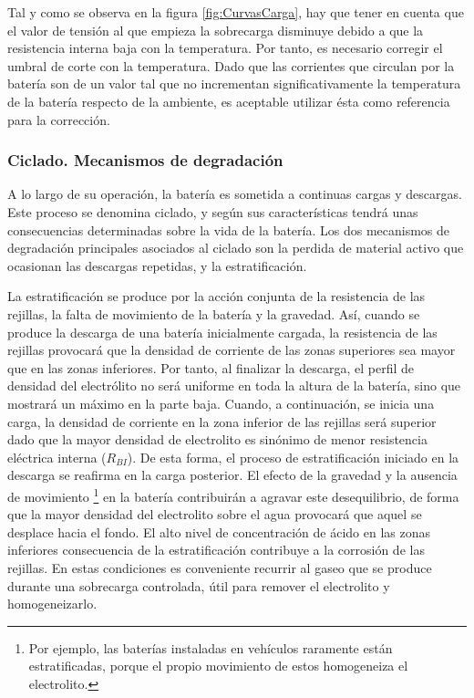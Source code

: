 Tal y como se observa en la figura \ref{fig:CurvasCarga}, hay que
tener en cuenta que el valor de tensión al que empieza la sobrecarga
disminuye debido a que la resistencia interna baja con la temperatura.
Por tanto, es necesario corregir el umbral de corte con la temperatura.
Dado que las corrientes que circulan por la batería son de un valor
tal que no incrementan significativamente la temperatura de la batería
respecto de la ambiente, es aceptable utilizar ésta como referencia
para la corrección.


\subsubsection{Ciclado. Mecanismos de degradación}

A lo largo de su operación, la batería es sometida a continuas cargas
y descargas. Este proceso se denomina ciclado, y según sus características
tendrá unas consecuencias determinadas sobre la vida de la batería.
Los dos mecanismos de degradación principales asociados al ciclado
son la perdida de material activo que ocasionan las descargas repetidas,
y la estratificación. 

La estratificación se produce por la acción conjunta de la resistencia
de las rejillas, la falta de movimiento de la batería y la gravedad.
Así, cuando se produce la descarga de una batería inicialmente
cargada, la resistencia de las rejillas provocará que la densidad de
corriente de las zonas superiores sea mayor que en las zonas
inferiores.  Por tanto, al finalizar la descarga, el perfil de
densidad del electrólito no será uniforme en toda la altura de la
batería, sino que mostrará un máximo en la parte baja. Cuando, a
continuación, se inicia una carga, la densidad de corriente en la zona
inferior de las rejillas será superior dado que la mayor densidad de
electrolito es sinónimo de menor resistencia eléctrica interna
($R_{BI}$). De esta forma, el proceso de estratificación iniciado en
la descarga se reafirma en la carga posterior. El efecto de la
gravedad y la ausencia de movimiento%
\footnote{Por ejemplo, las baterías instaladas en vehículos raramente
  están estratificadas, porque el propio movimiento de estos
  homogeneiza el electrolito.%
} en la batería contribuirán a agravar este desequilibrio, de forma
que la mayor densidad del electrolito sobre el agua provocará que
aquel se desplace hacia el fondo. El alto nivel de concentración de
ácido en las zonas inferiores consecuencia de la estratificación
contribuye a la corrosión de las rejillas. En estas condiciones es
conveniente recurrir al gaseo que se produce durante una sobrecarga
controlada, útil para remover el electrolito y homogeneizarlo.

